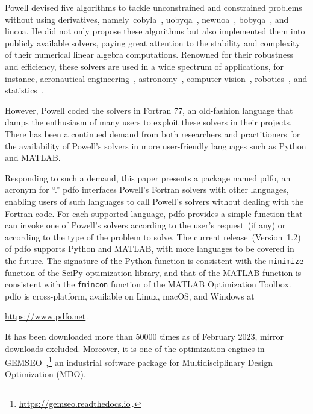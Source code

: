 \documentclass[
    smallextended,  %
    final,          %
]{svjour3}
\begin{document}
Powell devised five algorithms to tackle unconstrained and constrained problems without using derivatives, namely~\gls{cobyla}~\cite{Powell_1994}, \gls{uobyqa}~\cite{Powell_2002}, \gls{newuoa}~\cite{Powell_2006}, \gls{bobyqa}~\cite{Powell_2009}, and \gls{lincoa}.
He did not only propose these algorithms but also implemented them into publicly available solvers, paying great attention to the stability and complexity of their numerical linear algebra computations.
Renowned for their robustness and efficiency, these solvers are used in a wide spectrum of applications, for instance, aeronautical engineering~\cite{Gallard_Etal_2018}, astronomy~\cite{Mamon_Biviano_Boue_2013}, computer vision~\cite{Izadinia_Shan_Seitz_2017}, robotics~\cite{Mombaur_Truong_Laumond_2010}, and statistics~\cite{Bates_Etal_2015}.

However, Powell coded the solvers in Fortran 77, an old-fashion language that damps the enthusiasm of many users to exploit these solvers in their projects.
There has been a continued demand from both researchers and practitioners for the availability of Powell's solvers in more user-friendly languages such as Python and MATLAB.

Responding to such a demand, this paper presents a package named \gls{pdfo}, an acronym for ``.''
\gls{pdfo} interfaces Powell's Fortran solvers with other languages,
enabling users of such languages to call Powell's solvers without dealing with the Fortran code.
For each supported language, \gls{pdfo} provides a simple function that can invoke one of Powell's
solvers according to the user's request~(if any) or according to the type of the problem to solve.
The current release~(Version~1.2) of \gls{pdfo} supports Python and MATLAB, with more languages to be covered in the future.
The signature of the Python function is consistent with the \texttt{minimize} function of the SciPy
optimization library, and that of the MATLAB function is consistent with the \texttt{fmincon} function of the MATLAB Optimization Toolbox.
\gls{pdfo} is cross-platform, available on Linux, macOS, and Windows at
\begin{center}
    \url{https://www.pdfo.net}\,.
\end{center}
It has been downloaded more than \num{50000} times as of February 2023, mirror downloads excluded.
Moreover, it is one of the optimization engines in GEMSEO~\cite{Gallard_Etal_2018},\footnote{\url{https://gemseo.readthedocs.io}\,.}
an industrial software package for Multidisciplinary Design Optimization (MDO).
\end{document}
